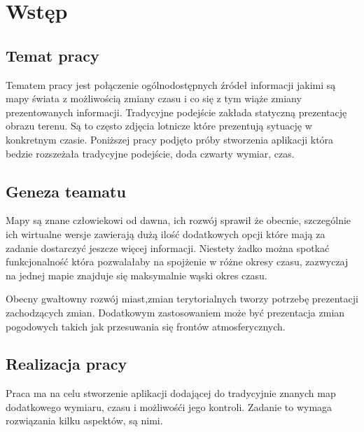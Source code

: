 \chapter{Wstęp}
\label{cha:wstep}

\nocite{gisSystems}
\nocite{webgis}
\nocite{imprxml}
\nocite{perfxml}



\section{Temat pracy}
\label{sec:tematPracy}


Tematem pracy jest połączenie ogólnodostępnych źródeł informacji jakimi są mapy świata z możliwością zmiany czasu i co się z tym wiąże zmiany prezentowanych informacji. Tradycyjne podejście zakłada statyczną prezentację obrazu terenu. Są to często zdjęcia lotnicze które prezentują sytuację w konkretnym czasie. Poniższej pracy podjęto próby stworzenia aplikacji która bedzie rozszeżała tradycyjne podejście, doda czwarty wymiar, czas.

\section{Geneza teamatu}
\label{sec:geneza}

Mapy są znane człowiekowi od dawna, ich rozwój sprawił że obecnie, szczególnie ich wirtualne wersje zawierają dużą ilość dodatkowych opcji które mają za zadanie dostarczyć jeszcze więcej informacji. Niestety żadko można spotkać funkcjonalność która pozwalałaby na spojżenie w różne okresy czasu, zazwyczaj na jednej mapie znajduje się maksymalnie wąski okres czasu.

Obecny gwałtowny rozwój miast,zmian terytorialnych tworzy potrzebę prezentacji zachodzących zmian. Dodatkowym zastosowaniem może być prezentacja zmian pogodowych takich jak przesuwania się frontów atmosferycznych.

\section{Realizacja pracy}
\label{sec:realizacja}

Praca ma na celu stworzenie aplikacji dodającej do tradycyjnie znanych map dodatkowego wymiaru, czasu i możliwośći jego kontroli. Zadanie to wymaga rozwiązania kilku aspektów, są nimi.

